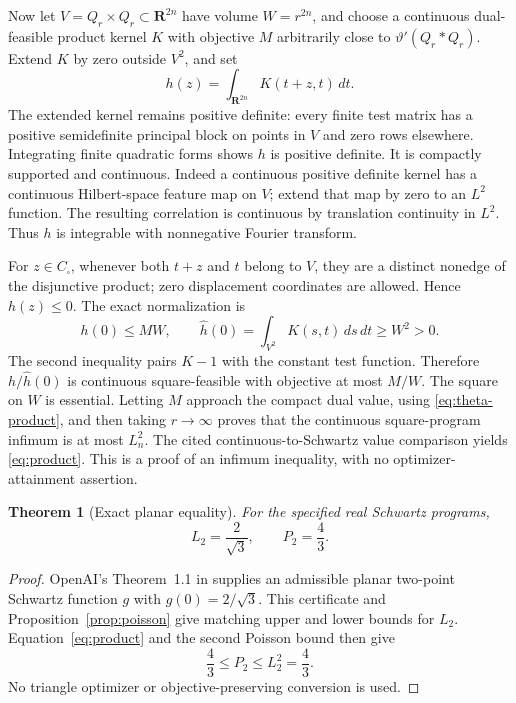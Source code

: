 \documentclass[11pt]{article}
\newtheorem{theorem}{Theorem}
\newcommand{\R}{\mathbf R}
\begin{document}
Now let $V=Q_r\times Q_r\subset\R^{2n}$ have volume $W=r^{2n}$, and choose a continuous dual-feasible product kernel $K$ with objective $M$ arbitrarily close to $\vartheta'(Q_r*Q_r)$. Extend $K$ by zero outside $V^2$, and set
\[
 h(z)=\int_{\R^{2n}}K(t+z,t)\,dt.
\]
The extended kernel remains positive definite: every finite test matrix has a positive semidefinite principal block on points in $V$ and zero rows elsewhere. Integrating finite quadratic forms shows $h$ is positive definite. It is compactly supported and continuous. Indeed a continuous positive definite kernel has a continuous Hilbert-space feature map on $V$; extend that map by zero to an $L^2$ function. The resulting correlation is continuous by translation continuity in $L^2$. Thus $h$ is integrable with nonnegative Fourier transform.

For $z\in C_\square$, whenever both $t+z$ and $t$ belong to $V$, they are a distinct nonedge of the disjunctive product; zero displacement coordinates are allowed. Hence $h(z)\le0$. The exact normalization is
\[
 h(0)\le MW,\qquad
 \widehat h(0)=\int_{V^2}K(s,t)\,ds\,dt\ge W^2>0.
\]
The second inequality pairs $K-1$ with the constant test function. Therefore $h/\widehat h(0)$ is continuous square-feasible with objective at most $M/W$. The square on $W$ is essential. Letting $M$ approach the compact dual value, using \eqref{eq:theta-product}, and then taking $r\to\infty$ proves that the continuous square-program infimum is at most $L_n^2$. The cited continuous-to-Schwartz value comparison yields \eqref{eq:product}. This is a proof of an infimum inequality, with no optimizer-attainment assertion.

\begin{theorem}[Exact planar equality]\label{thm:planar}
For the specified real Schwartz programs,
\[
 L_2=\frac2{\sqrt3},\qquad P_2=\frac43.
\]
\end{theorem}
\begin{proof}
OpenAI's Theorem~1.1 in \cite{oai090} supplies an admissible planar two-point Schwartz function $g$ with $g(0)=2/\sqrt3$. This certificate and Proposition~\ref{prop:poisson} give matching upper and lower bounds for $L_2$. Equation~\eqref{eq:product} and the second Poisson bound then give
\[
 \frac43\le P_2\le L_2^2=\frac43.
\]
No triangle optimizer or objective-preserving conversion is used.
\end{proof}
\end{document}
